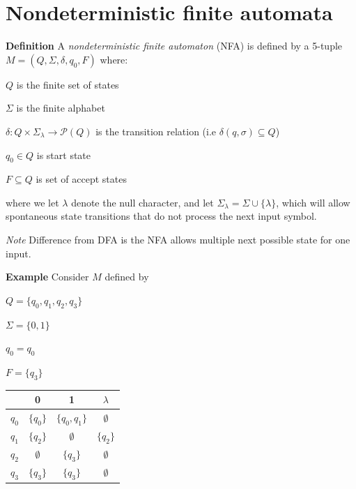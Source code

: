 \documentclass[oneside, 12pt]{book}
\begin{document}
\section{Nondeterministic finite automata}

\textbf{Definition} A \emph{nondeterministic finite automaton} (NFA) is defined by a 5-tuple $M=(Q,\Sigma, \delta, q_{0}, F)$ where:

$Q$ is the finite set of states

$\Sigma$ is the finite alphabet

$\delta: Q\times \Sigma_{\lambda}\to \mathcal{P}(Q)$ is the transition relation (i.e $\delta(q, \sigma)\subseteq Q$)

$q_{0}\in Q$ is start state

$F\subseteq Q$ is set of accept states

where we let $\lambda$ denote the null character, and let $\Sigma_{\lambda} = \Sigma\cup \{\lambda\}$, which will allow spontaneous state transitions that do not process the next input symbol.

\emph{Note} Difference from DFA is the NFA allows multiple next possible state for one input.

\textbf{Example} Consider $M$ defined by

$Q = \{q_{0}, q_{1}, q_{2}, q_{3}\}$

$\Sigma = \{0,1\}$

$q_{0} = q_{0}$

$F=\{q_{3}\}$

\begin{center}
  \begin{tabular}{| c| c| c| c| }
    \hline
    & 0 & 1 & $\lambda$\\
    \hline
    $q_{0}$ & $\{q_{0}\}$ & $\{q_{0}, q_{1}\}$ & $\emptyset$\\
    $q_{1}$ & $\{q_{2}\}$ & $\emptyset$ & $\{q_{2}\}$\\
    $q_{2}$ & $\emptyset$ & $\{q_{3}\}$ & $\emptyset$\\
    $q_{3}$ & $\{q_{3}\}$ & $\{q_{3}\}$ & $\emptyset$\\
    \hline
  \end{tabular}
\end{center}

\end{document}
